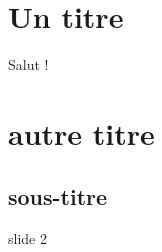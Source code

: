  
\section{Un titre}
\begin{frame}
	Salut !
\end{frame}
	
\section{autre titre}
\subsection{sous-titre}

\begin{frame}
	slide 2
\end{frame}